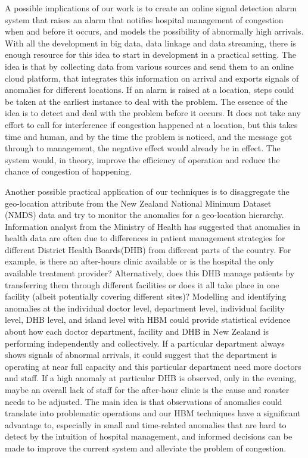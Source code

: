 A possible implications of our work is to create an online signal detection alarm system that raises an alarm that notifies hospital management of congestion when and before it occurs, and models the possibility of abnormally high arrivals. With all the development in big data, data linkage and data streaming, there is enough resource for this idea to start in development in a practical setting. The idea is that by collecting data from various sources and send them to an online cloud platform, that integrates this information on arrival and exports signals of anomalies for different locations. If an alarm is raised at a location, steps could be taken at the earliest instance to deal with the problem. The essence of the idea is to detect and deal with the problem before it occurs.  It does not take any effort to call for interference if congestion happened at a location, but this takes time and human, and by the time the problem is noticed, and the message got through to management, the negative effect would already be in effect. The system would, in theory, improve the efficiency of operation and reduce the chance of congestion of happening. 

\newpara

Another possible practical application of our techniques is to disaggregate the geo-location attribute from the New Zealand National Minimum Dataset (NMDS) data and try to monitor the anomalies for a geo-location hierarchy. Information analyst from the Ministry of Health has suggested that anomalies in health data are often due to differences in patient management strategies for different District Health Boards(DHB) from different parts of the country. For example, is there an after-hours clinic available or is the hospital the only available treatment provider? Alternatively, does this DHB manage patients by transferring them through different facilities or does it all take place in one facility (albeit potentially covering different sites)?  Modelling and identifying anomalies at the individual doctor level, department level, individual facility level, DHB level, and island level with HBM could provide statistical evidence about how each doctor department, facility and DHB in New Zealand is performing independently and collectively. If a particular department always shows signals of abnormal arrivals, it could suggest that the department is operating at near full capacity and this particular department need more doctors and staff. If a high anomaly at particular DHB is observed, only in the evening, maybe an overall lack of staff for the after-hour clinic is the cause and roaster needs to be adjusted. The main idea is that observations of anomalies could translate into problematic operations and our HBM techniques have a significant advantage to, especially in small and time-related anomalies that are hard to detect by the intuition of hospital management, and informed decisions can be made to improve the current system and alleviate the problem of congestion. 

